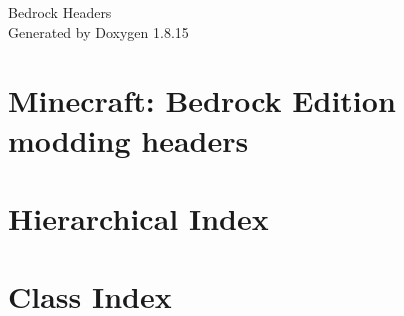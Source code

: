 \let\mypdfximage\pdfximage\def\pdfximage{\immediate\mypdfximage}\documentclass[twoside]{book}
\newcommand{\+}{\discretionary{\mbox{\scriptsize$\hookleftarrow$}}{}{}}
\newcommand{\clearemptydoublepage}{%
  \newpage{\pagestyle{empty}\cleardoublepage}%
}
\begin{document}
\hypersetup{pageanchor=false,
             bookmarksnumbered=true,
             pdfencoding=unicode
            }
\begin{titlepage}
\vspace*{7cm}
\begin{center}%
{\Large Bedrock Headers }\\
\vspace*{1cm}
{\large Generated by Doxygen 1.8.15}\\
\end{center}
\end{titlepage}
\clearemptydoublepage
{}
\tableofcontents
\clearemptydoublepage
{}
\hypersetup{pageanchor=true}

\chapter{Minecraft\+: Bedrock Edition modding headers}
\label{md__home_void__c_lion_projects_bedrock-headers__r_e_a_d_m_e}

\chapter{Hierarchical Index}

\chapter{Class Index}

\end{document}
